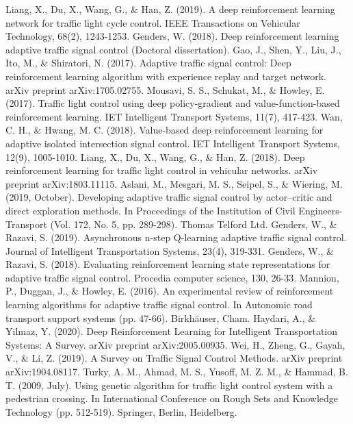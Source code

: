 \documentclass[conference]{IEEEtran}
\begin{document}
\begin{thebibliography}{1}
 Liang, X., Du, X., Wang, G., \& Han, Z. (2019). A deep reinforcement learning network for traffic light cycle control. IEEE Transactions on Vehicular Technology, 68(2), 1243-1253.
 Genders, W. (2018). Deep reinforcement learning adaptive traffic signal control (Doctoral dissertation).
 Gao, J., Shen, Y., Liu, J., Ito, M., \& Shiratori, N. (2017). Adaptive traffic signal control: Deep reinforcement learning algorithm with experience replay and target network. arXiv preprint arXiv:1705.02755.
 Mousavi, S. S., Schukat, M., \& Howley, E. (2017). Traffic light control using deep policy-gradient and value-function-based reinforcement learning. IET Intelligent Transport Systems, 11(7), 417-423.
 Wan, C. H., \& Hwang, M. C. (2018). Value-based deep reinforcement learning for adaptive isolated intersection signal control. IET Intelligent Transport Systems, 12(9), 1005-1010.
 Liang, X., Du, X., Wang, G., \& Han, Z. (2018). Deep reinforcement learning for traffic light control in vehicular networks. arXiv preprint arXiv:1803.11115.
 Aslani, M., Mesgari, M. S., Seipel, S., \& Wiering, M. (2019, October). Developing adaptive traffic signal control by actor–critic and direct exploration methods. In Proceedings of the Institution of Civil Engineers-Transport (Vol. 172, No. 5, pp. 289-298). Thomas Telford Ltd.
 Genders, W., \& Razavi, S. (2019). Asynchronous n-step Q-learning adaptive traffic signal control. Journal of Intelligent Transportation Systems, 23(4), 319-331.
 Genders, W., \& Razavi, S. (2018). Evaluating reinforcement learning state representations for adaptive traffic signal control. Procedia computer science, 130, 26-33.
 Mannion, P., Duggan, J., \& Howley, E. (2016). An experimental review of reinforcement learning algorithms for adaptive traffic signal control. In Autonomic road transport support systems (pp. 47-66). Birkhäuser, Cham.
 Haydari, A., \& Yilmaz, Y. (2020). Deep Reinforcement Learning for Intelligent Transportation Systems: A Survey. arXiv preprint arXiv:2005.00935.
 Wei, H., Zheng, G., Gayah, V., \& Li, Z. (2019). A Survey on Traffic Signal Control Methods. arXiv preprint arXiv:1904.08117.
 Turky, A. M., Ahmad, M. S., Yusoff, M. Z. M., \& Hammad, B. T. (2009, July). Using genetic algorithm for traffic light control system with a pedestrian crossing. In International Conference on Rough Sets and Knowledge Technology (pp. 512-519). Springer, Berlin, Heidelberg.

\end{thebibliography}
\end{document}

